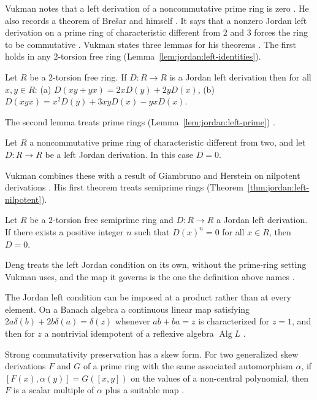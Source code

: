 Vukman notes that a left derivation of a noncommutative prime ring is zero
\cite[p.~1]{Vukman1997}. He also records a theorem of Brešar and himself
\cite[p.~1]{Vukman1997}. It says that a nonzero Jordan left derivation on a prime ring of
characteristic different from $2$ and $3$ forces the ring to be commutative
\cite[p.~1]{Vukman1997}. Vukman states three lemmas for his theorems \cite[p.~2]{Vukman1997}. The
first holds in any $2$-torsion free ring (Lemma~\ref{lem:jordan:left-identities}).

\begin{lemma}\label{lem:jordan:left-identities}
Let $R$ be a $2$-torsion free ring. If $D\colon R\to R$ is a Jordan left derivation then for all
$x,y\in R$: (a) $D(xy+yx)=2xD(y)+2yD(x)$, (b) $D(xyx)=x^{2}D(y)+3xyD(x)-yxD(x)$.
\end{lemma}

The second lemma treats prime rings (Lemma~\ref{lem:jordan:left-prime}) \cite[p.~2]{Vukman1997}.

\begin{lemma}\label{lem:jordan:left-prime}
Let $R$ a noncommutative prime ring of characteristic different from two, and let $D\colon R\to R$ be a
left Jordan derivation. In this case $D=0$.
\end{lemma}

Vukman combines these with a result of Giambruno and Herstein on nilpotent derivations
\cite[p.~1]{Vukman1997}. His first theorem treats semiprime rings (Theorem~\ref{thm:jordan:left-nilpotent}).

\begin{theorem}\label{thm:jordan:left-nilpotent}
Let $R$ be a $2$-torsion free semiprime ring and $D\colon R\to R$ a Jordan left derivation. If there
exists a positive integer $n$ such that $D(x)^{n}=0$ for all $x\in R$, then $D=0$.
\end{theorem}

Deng treats the left Jordan condition on its own, without the prime-ring setting
Vukman uses, and the map it governs is the one the definition above names
\cite[Abstract]{Deng1992JordanLeft}.

The Jordan left condition can be imposed at a product rather than at every
element. On a Banach algebra a continuous linear map satisfying
$2a\delta(b)+2b\delta(a)=\delta(z)$ whenever $ab+ba=z$ is characterized for
$z=1$, and then for $z$ a nontrivial idempotent of a reflexive algebra
$\operatorname{Alg}L$ \cite[Abstract]{ContinuousLinearReflexive2013}.

Strong commutativity preservation has a skew form. For two generalized skew
derivations $F$ and $G$ of a prime ring with the same associated automorphism
$\alpha$, if $[F(x),\alpha(y)]=G([x,y])$ on the values of a non-central
polynomial, then $F$ is a scalar multiple of $\alpha$ plus a suitable map
\cite[Abstract]{AutomorphismsGeneralizedSkew2016}.

